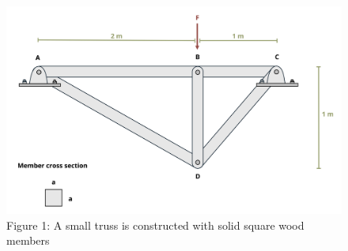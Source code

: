 \documentclass[
  letterpaper,
  DIV=11,
  numbers=noendperiod]{scrreprt}
\begin{document}
\begin{figure}[H]

{\centering \includegraphics{images/157.png}

}

\caption{Figure 1: A small truss is constructed with solid square wood
members}

\end{figure}%
\end{document}
